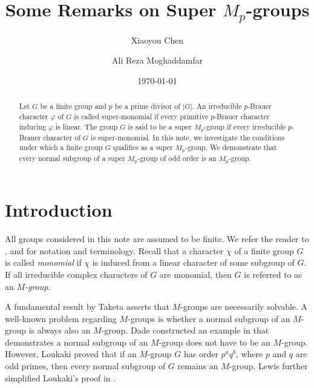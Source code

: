 \documentclass[12pt]{amsart}
\theoremstyle{remark}
\numberwithin{equation}{section}
\begin{document}
\title[Some Remarks on Super $M_{p}$-groups]
{Some Remarks on Super $M_{p}$-groups}
\author[Xiaoyou Chen] {Xiaoyou Chen}
\address{School of Mathematics and Statistics, Henan University of Technology, Zhengzhou 450001, China}
\author[Ali Reza Moghaddamfar]{Ali Reza Moghaddamfar}
\address{Faculty of Mathematics, K. N. Toosi University of Technology, P. O. Box 16765--3381,
Tehran, Iran}


\date{\today}



\begin{abstract}
Let $G$ be a finite group and $p$ be a prime divisor of $|G|$.
An irreducible $p$-Brauer character $\varphi$ of $G$ is called super-monomial if
every primitive $p$-Brauer character inducing $\varphi$ is linear. The group 
$G$ is said to be a super $M_{p}$-group if every irreducible $p$-Brauer character of $G$ is super-monomial.
In this note, we investigate the conditions under which a finite group $G$ qualifies as a super $M_{p}$-group.
We demonstrate that every normal subgroup of a super $M_{p}$-group of odd order is an $M_{p}$-group.
\end{abstract}

\maketitle

\section{Introduction}\label{sec1}
All groups considered in this note are assumed to be finite.
We refer the reader to \cite{Isaacs1976},
\cite{CSG}  and \cite{Navarro1998} for notation and terminology.
Recall that a character $\chi$ of a finite group $G$ is called {\em monomial} if
$\chi$ is induced from a linear character of some subgroup of $G$.
If all irreducible complex characters of $G$ are monomial,
then $G$ is referred to as an {\em $M$-group}.

A  fundamental result by Taketa \cite{Taketa} asserts that $M$-groups are necessarily solvable.
A well-known problem regarding $M$-groups is 
whether a normal subgroup of an $M$-group is always also an $M$-group.
Dade constructed an example in \cite{Dade} that demonstrates 
a normal subgroup of an $M$-group does not have to be an $M$-group.
However, Loukaki \cite{Loukaki} proved that if an $M$-group $G$ has order $p^{a}q^{b}$,
where $p$ and $q$ are odd primes, then every normal subgroup of $G$ remains an $M$-group.
Lewis further simplified Loukaki's proof in \cite{Lewis2006}.
\end{document}
